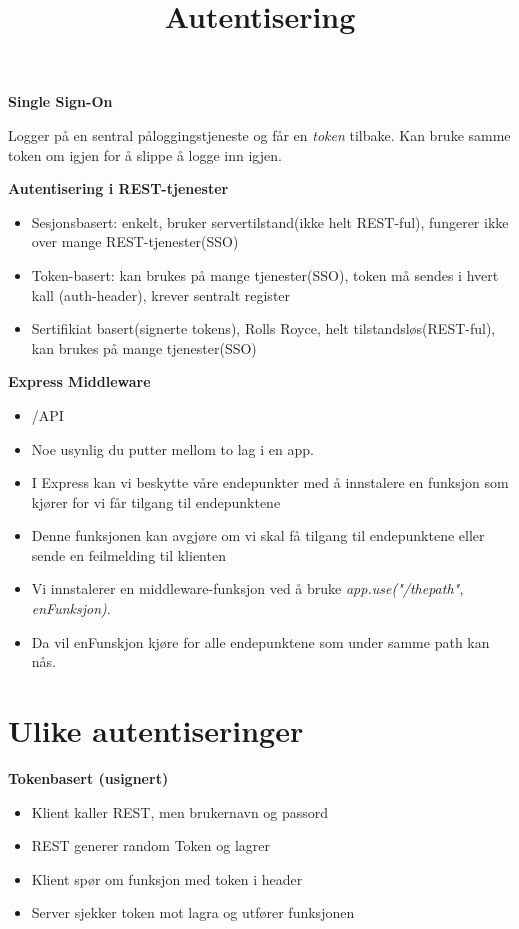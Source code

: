 \documentclass{article}
\title{Autentisering}
\begin{document}
\begin{flushleft}
    \textbf{Single Sign-On}\par
    Logger på en sentral påloggingstjeneste og får en \emph{token} tilbake. 
    Kan bruke samme token om igjen for å slippe å logge inn igjen. \par 

    \textbf{Autentisering i REST-tjenester}\par  
    \begin{itemize}
        \item Sesjonsbasert: enkelt, bruker servertilstand(ikke helt REST-ful), fungerer ikke over mange REST-tjenester(SSO)
        \item Token-basert: kan brukes på mange tjenester(SSO), token må sendes i hvert kall (auth-header), krever sentralt register
        \item Sertifikiat basert(signerte tokens), Rolls Royce, helt tilstandsløs(REST-ful), kan brukes på mange tjenester(SSO) 
    \end{itemize}

    \textbf{Express Middleware}
    \begin{itemize}
        \item /API
        \item Noe usynlig du putter mellom to lag i en app.
        \item I Express kan vi beskytte våre endepunkter med å innstalere en funksjon som kjører for vi får tilgang til endepunktene
        \item Denne funksjonen kan avgjøre om vi skal få tilgang til endepunktene eller sende en feilmelding til klienten
        \item Vi innstalerer en middleware-funksjon ved å bruke \emph{app.use("/thepath", enFunksjon)}.
        \item Da vil enFunskjon kjøre for alle endepunktene som under samme path kan nås.
    \end{itemize}

    \section{Ulike autentiseringer}

    \textbf{Tokenbasert (usignert)}
    \begin{itemize}
        \item Klient kaller REST, men brukernavn og passord
        \item REST generer random Token og lagrer
        \item Klient spør om funksjon med token i header 
        \item Server sjekker token mot lagra og utfører funksjonen 
    \end{itemize}


\end{flushleft}
\end{document}
